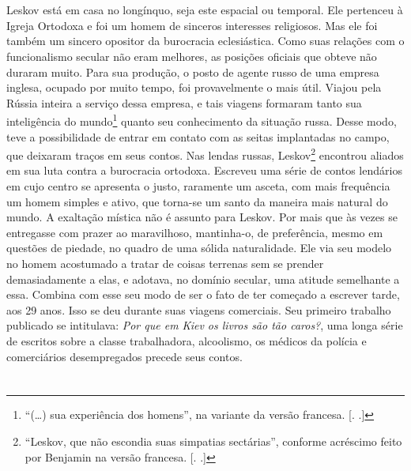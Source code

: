 \section{}

Leskov está em casa no longínquo, seja este espacial ou temporal. Ele
pertenceu à Igreja Ortodoxa e foi um homem de sinceros interesses
religiosos. Mas ele foi também um sincero opositor da burocracia
eclesiástica. Como suas relações com o funcionalismo secular não eram
melhores, as posições oficiais que obteve não duraram muito. Para sua
produção, o posto de agente russo de uma empresa inglesa, ocupado
por muito tempo, foi provavelmente o mais útil. Viajou pela Rússia
inteira a serviço dessa empresa, e tais viagens formaram tanto sua
inteligência do mundo\footnote{``(\ldots{}) sua experiência dos homens'', na
  variante da versão francesa. [. .]} quanto seu conhecimento
da situação russa. Desse modo, teve a possibilidade de entrar em contato
com as seitas implantadas no campo, que deixaram traços em seus contos.
Nas lendas russas, Leskov\footnote{``Leskov, que não escondia suas
  simpatias sectárias'', conforme acréscimo feito por Benjamin na
  versão francesa. [. .]} encontrou aliados em sua luta contra
a burocracia ortodoxa. Escreveu uma série de contos lendários em cujo
centro se apresenta o justo, raramente um asceta, com mais frequência um
homem simples e ativo, que torna-se um santo da maneira mais natural do
mundo. A exaltação mística não é assunto para Leskov. Por mais que às
vezes se entregasse com prazer ao maravilhoso, mantinha-o, de
preferência, mesmo em questões de piedade, no quadro de uma sólida
naturalidade. Ele via seu modelo no homem acostumado a tratar de coisas
terrenas sem se prender demasiadamente a elas, e adotava, no domínio
secular, uma atitude semelhante a essa. Combina com esse seu modo de ser
o fato de ter começado a escrever tarde, aos 29 anos. Isso se deu durante
suas viagens comerciais. Seu primeiro trabalho publicado se intitulava:
\emph{Por que em Kiev os livros são tão caros?}, uma longa série de escritos
sobre a classe trabalhadora, alcoolismo, os médicos da
polícia e comerciários desempregados precede seus contos.

\section{}

